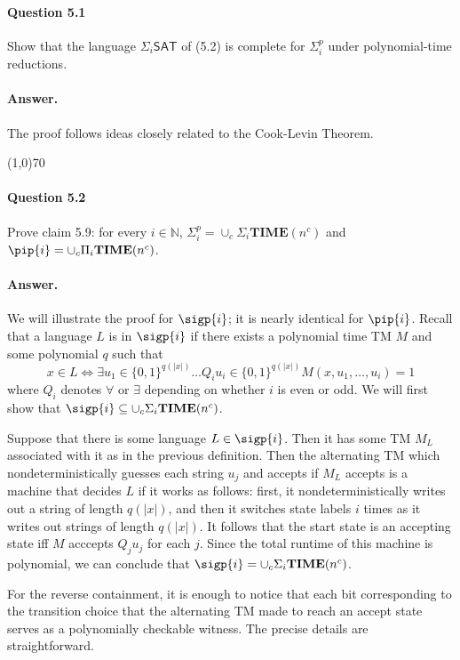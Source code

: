 \paragraph{Question 5.1} Show that the language $\Sigma_i\mathsf{SAT}$ of (5.2) is complete for $\Sigma_i^p$ under polynomial-time reductions.

\paragraph{Answer.} The proof follows ideas closely related to the Cook-Levin Theorem.

\begin{center}
	\line(1,0){70}
\end{center}

\paragraph{Question 5.2}
\label{Q5.2}
Prove claim 5.9: for every $i\in\mathbb{N}$, $\Sigma_i^p=\cup_c\Sigma_i\mathbf{TIME}(n^c)$ and $\pip{i}=\cup_c\Pi_i\mathbf{TIME}(n^c)$.

\paragraph{Answer.} We will illustrate the proof for $\sigp{i}$; it is nearly identical for $\pip{i}$. Recall that a language $L$ is in $\sigp{i}$ if there exists a polynomial time TM $M$ and some polynomial $q$ such that 
$$x\in L\iff \exists u_1\in\{0,1\}^{q(|x|)}\dots Q_iu_i\in \{0,1\}^{q(|x|)} M(x,u_1,\dots,u_i)=1$$
where $Q_i$ denotes $\forall$ or $\exists$ depending on whether $i$ is even or odd. We will first show that $\sigp{i}\subseteq\cup_c\Sigma_i\mathbf{TIME}(n^c)$.

Suppose that there is some language $L\in\sigp{i}$. Then it has some TM $M_L$ associated with it as in the previous definition. Then the alternating TM which nondeterministically guesses each string $u_j$ and accepts if $M_L$ accepts is a machine that decides $L$ if it works as follows: first, it nondeterministically writes out a string of length $q(|x|)$, and then it switches state labels $i$ times as it writes out strings of length $q(|x|)$. It follows that the start state is an accepting state iff $M$ acccepts $Q_ju_j$ for each $j$. Since the total runtime of this machine is polynomial, we can conclude that $\sigp{i}=\cup_c\Sigma_i\mathbf{TIME}(n^c)$.

For the reverse containment, it is enough to notice that each bit corresponding to the transition choice that the alternating TM made to reach an accept state serves as a polynomially checkable witness. The precise details are straightforward.

